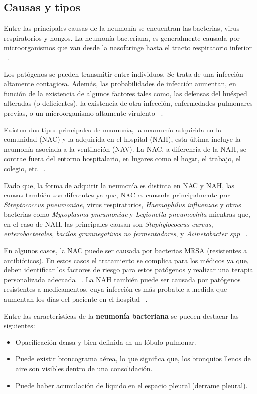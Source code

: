 \subsection{Causas y tipos}

Entre las principales causas de la neumonía se encuentran las bacterias, virus respiratorios y hongos. La neumonía bacteriana, es generalmente causada por microorganismos que van desde la nasofaringe hasta el tracto respiratorio inferior ~\cite{antoni2021}.

Los patógenos se pueden transmitir entre individuos. Se trata de una infección altamente contagiosa. Además, las probabilidades de infección aumentan, en función de la existencia de algunos factores tales como, las defensas del huésped alteradas (o deficientes), la existencia de otra infección, enfermedades pulmonares previas, o un microorganismo altamente virulento ~\cite{antoni2021}.

Existen dos tipos principales de neumonía, la neumonía adquirida en la comunidad (NAC) y la adquirida en el hospital (NAH), esta última incluye la neumonía asociada a la ventilación (NAV). La NAC, a diferencia de la NAH, se contrae fuera del entorno hospitalario, en lugares como el hogar, el trabajo, el colegio, etc ~\cite{antoni2021}.

Dado que, la forma de adquirir la neumonía es distinta en NAC y NAH, las causas también son diferentes ya que, NAC es causada principalmente por \textit{Streptococcus pneumoniae}, virus respiratorios, \textit{Haemophilus influenzae} y otras bacterias como \textit{Mycoplasma pneumoniae} y \textit{Legionella pneumophila} mientras que, en el caso de NAH, las principales causan son \textit{Staphylococcus aureus}, \textit{enterobacterales}, \textit{bacilos gramnegativos no fermentadores}, y \textit{Acinetobacter spp} ~\cite{antoni2021}.

En algunos casos, la NAC puede ser causada por bacterias MRSA (resistentes a antibióticos). En estos casos el tratamiento se complica para los médicos ya que, deben identificar los factores de riesgo para estos patógenos y realizar una terapia personalizada adecuada ~\cite{antoni2021}. La NAH también puede ser causada por patógenos resistentes a medicamentos, cuya infección es más probable a medida que aumentan los días del paciente en el hospital ~\cite{lim2022pneumonia}.

Entre las características de la \textbf{neumonía bacteriana} se pueden destacar las siguientes:
\begin{itemize}
    \item Opacificación densa y bien definida en un lóbulo pulmonar.
    \item Puede existir broncograma aérea, lo que significa que, los bronquios llenos de aire son visibles dentro de una consolidación.
    \item Puede haber acumulación de líquido en el espacio pleural (derrame pleural).
\end{itemize}

